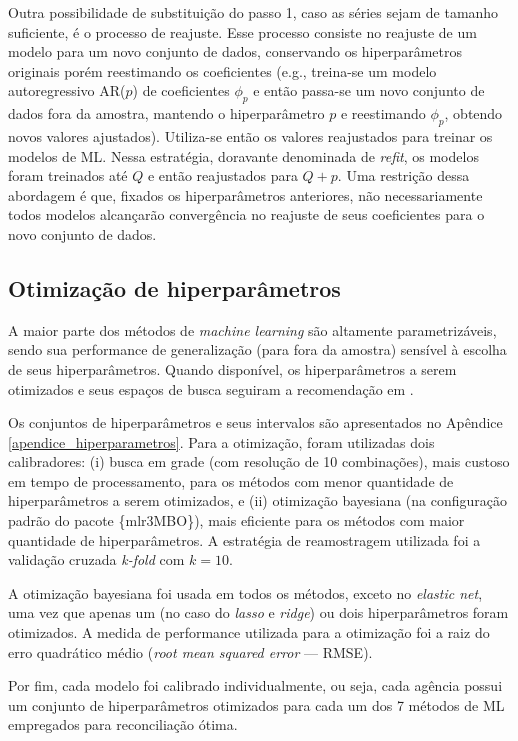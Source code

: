 \documentclass[
  12pt,
  twoside,
  openright,
  a4paper,
  chapter=TITLE,
  section=TITLE,
  brazil]{abntex2}
\begin{document}
Outra possibilidade de substituição do passo 1, caso as séries sejam de
tamanho suficiente, é o processo de reajuste. Esse processo consiste no
reajuste de um modelo para um novo conjunto de dados, conservando os
hiperparâmetros originais porém reestimando os coeficientes (e.g.,
treina-se um modelo autoregressivo AR(\(p\)) de coeficientes \(\phi_p\)
e então passa-se um novo conjunto de dados fora da amostra, mantendo o
hiperparâmetro \(p\) e reestimando \(\phi_p\), obtendo novos valores
ajustados). Utiliza-se então os valores reajustados para treinar os
modelos de ML. Nessa estratégia, doravante denominada de \emph{refit},
os modelos foram treinados até \(Q\) e então reajustados para \(Q+p\).
Uma restrição dessa abordagem é que, fixados os hiperparâmetros
anteriores, não necessariamente todos modelos alcançarão convergência no
reajuste de seus coeficientes para o novo conjunto de dados.

\subsection{Otimização de
hiperparâmetros}\label{otimizauxe7uxe3o-de-hiperparuxe2metros}

A maior parte dos métodos de \emph{machine learning} são altamente
parametrizáveis, sendo sua performance de generalização (para fora da
amostra) sensível à escolha de seus hiperparâmetros. Quando disponível,
os hiperparâmetros a serem otimizados e seus espaços de busca seguiram a
recomendação em \textcite{bischl_hyperparameter_2021}.

Os conjuntos de hiperparâmetros e seus intervalos são apresentados no
Apêndice \ref{apendice_hiperparametros}. Para a otimização, foram
utilizadas dois calibradores: (i) busca em grade (com resolução de 10
combinações), mais custoso em tempo de processamento, para os métodos
com menor quantidade de hiperparâmetros a serem otimizados, e (ii)
otimização bayesiana (na configuração padrão do pacote \{mlr3MBO\}),
mais eficiente para os métodos com maior quantidade de hiperparâmetros.
A estratégia de reamostragem utilizada foi a validação cruzada
\emph{k-fold} com \(k=10\).

A otimização bayesiana foi usada em todos os métodos, exceto no
\emph{elastic net}, uma vez que apenas um (no caso do \emph{lasso} e
\emph{ridge}) ou dois hiperparâmetros foram otimizados. A medida de
performance utilizada para a otimização foi a raiz do erro quadrático
médio (\emph{root mean squared error} --- RMSE).

Por fim, cada modelo foi calibrado individualmente, ou seja, cada
agência possui um conjunto de hiperparâmetros otimizados para cada um
dos 7 métodos de ML empregados para reconciliação ótima.
\end{document}
